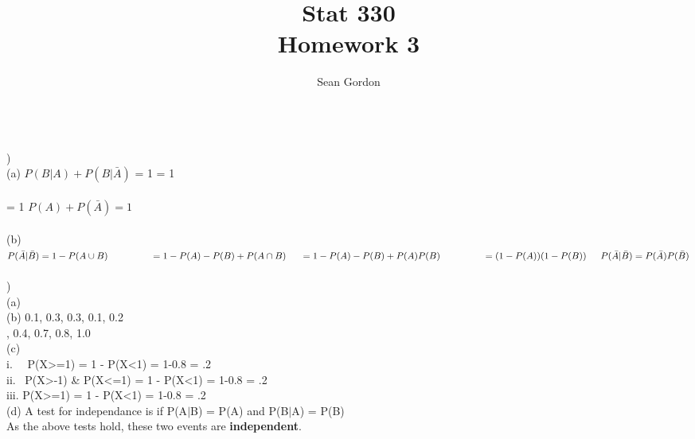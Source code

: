 \documentclass[12pt]{article}
\title{Stat 330\\Homework 3}
\author{Sean Gordon}
\begin{document}
\maketitle


\noindent\hrulefill \\


)\\
\indent (a) $P(B|A) + P(B|\bar{A})$ = 1
\indent \indent {} = 1\\\\
\indent {} = 1
\indent \indent \indent  $P(A) + P(\bar{A}) = 1$ \checkmark\\

\indent \indent  \hrulefill \indent \indent \indent \\

\indent (b) $P(\bar{A}|\bar{B}) = 1 - P(A \cup B)
\indent \indent \indent = 1 - P(A) - P(B) + P(A \cap B)\\\\
\indent = 1 - P(A) - P(B) + P(A)P(B)
\indent \indent \indent = (1 - P(A))(1 - P(B))\\\\
\indent  P(\bar{A}|\bar{B}) = P(\bar{A})P(\bar{B})$ \checkmark\\


\noindent \hrulefill \\


)\\
\indent (a) \\
\indent (b) 0.1, 0.3, 0.3, 0.1, 0.2\\
\indent {}, 0.4, 0.7, 0.8, 1.0\\
\indent (c) \\
\indent \indent i. \ \ P(X>=1) = 1 - P(X<1) = 1-0.8 = .2\\
\indent \indent ii. \ P(X>-1) & P(X<=1) = 1 - P(X<1) = 1-0.8 = .2\\
\indent \indent iii. P(X>=1) = 1 - P(X<1) = 1-0.8 = .2\\
\indent (d) A test for independance is if P(A$|$B) = P(A) and P(B$|$A) = P(B)\\
\indent \indent As the above tests hold, these two events are \textbf{independent}.\\


\noindent \hrulefill \\
\pagebreak
\end{document}
